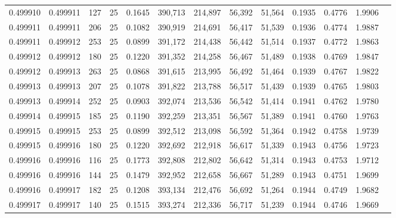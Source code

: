 \begin{tabular}{rrrrrrrrrrrrr}
0.499910 & 0.499911 & 127 &  25 &                                     0.1645 & 390,713 & 214,897 &  56,392 &  51,564 & 0.1935 & 0.4776 & 1.9906 \\
0.499911 & 0.499911 & 206 &  25 &                                     0.1082 & 390,919 & 214,691 &  56,417 &  51,539 & 0.1936 & 0.4774 & 1.9887 \\
0.499911 & 0.499912 & 253 &  25 &                                     0.0899 & 391,172 & 214,438 &  56,442 &  51,514 & 0.1937 & 0.4772 & 1.9863 \\
0.499912 & 0.499912 & 180 &  25 &                                     0.1220 & 391,352 & 214,258 &  56,467 &  51,489 & 0.1938 & 0.4769 & 1.9847 \\
0.499912 & 0.499913 & 263 &  25 &                                     0.0868 & 391,615 & 213,995 &  56,492 &  51,464 & 0.1939 & 0.4767 & 1.9822 \\
0.499913 & 0.499913 & 207 &  25 &                                     0.1078 & 391,822 & 213,788 &  56,517 &  51,439 & 0.1939 & 0.4765 & 1.9803 \\
0.499913 & 0.499914 & 252 &  25 &                                     0.0903 & 392,074 & 213,536 &  56,542 &  51,414 & 0.1941 & 0.4762 & 1.9780 \\
0.499914 & 0.499915 & 185 &  25 &                                     0.1190 & 392,259 & 213,351 &  56,567 &  51,389 & 0.1941 & 0.4760 & 1.9763 \\
0.499915 & 0.499915 & 253 &  25 &                                     0.0899 & 392,512 & 213,098 &  56,592 &  51,364 & 0.1942 & 0.4758 & 1.9739 \\
0.499915 & 0.499916 & 180 &  25 &                                     0.1220 & 392,692 & 212,918 &  56,617 &  51,339 & 0.1943 & 0.4756 & 1.9723 \\
0.499916 & 0.499916 & 116 &  25 &                                     0.1773 & 392,808 & 212,802 &  56,642 &  51,314 & 0.1943 & 0.4753 & 1.9712 \\
0.499916 & 0.499916 & 144 &  25 &                                     0.1479 & 392,952 & 212,658 &  56,667 &  51,289 & 0.1943 & 0.4751 & 1.9699 \\
0.499916 & 0.499917 & 182 &  25 &                                     0.1208 & 393,134 & 212,476 &  56,692 &  51,264 & 0.1944 & 0.4749 & 1.9682 \\
0.499917 & 0.499917 & 140 &  25 &                                     0.1515 & 393,274 & 212,336 &  56,717 &  51,239 & 0.1944 & 0.4746 & 1.9669 \\

\end{tabular}
